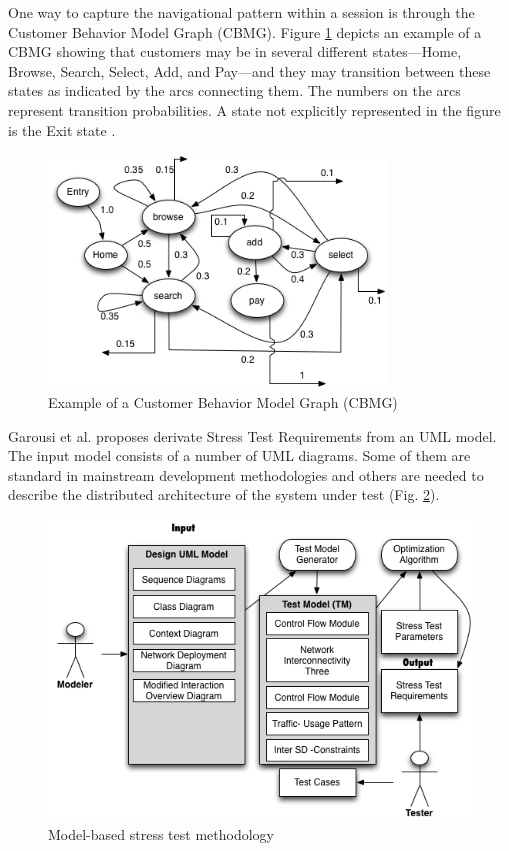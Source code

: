 One way to capture the navigational pattern within a session is through the Customer Behavior Model Graph (CBMG). Figure \ref{fig:cbmg} depicts an example of a CBMG showing that customers may be in several different states—Home, Browse, Search, Select, Add, and Pay—and they may transition between these states as indicated by the arcs connecting them. The numbers on the arcs represent transition probabilities. A state not explicitly represented in the figure is the Exit state \cite{Menasce2002a} \cite{Jiang2010} \cite{MohammadS.Obaidat}. 

\begin{figure}[!ht]
\centering
\includegraphics[width=0.8\textwidth]{./images/cbmg.png}
\caption{Example of a Customer Behavior Model Graph (CBMG)  \cite{Menasce2002a} \cite{Jiang2010} \cite{MohammadS.Obaidat}}
\label{fig:cbmg}
\end{figure}

Garousi et al. proposes derivate Stress Test Requirements from an UML model. The input model consists of a number of UML diagrams. Some of
them are standard in mainstream development methodologies and others are needed to describe the distributed architecture of the system under test (Fig. \ref{fig:modelbased}).

\begin{figure}[!ht]
\centering
\includegraphics[width=1\textwidth]{./images/modelmethodology.png}
\caption{Model-based stress test methodology}
\label{fig:modelbased}
\end{figure}

